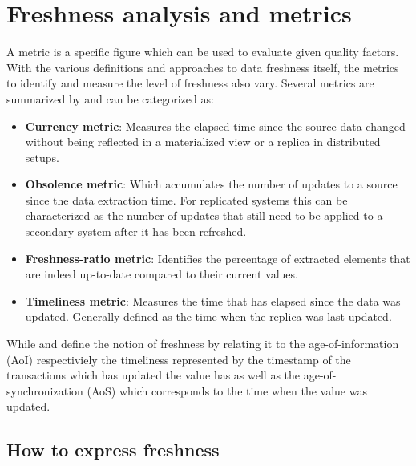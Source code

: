 \section{Freshness analysis and metrics}
\label{r:freshness_metrics}
A metric is a specific figure which can be used to evaluate given quality factors.
With the various definitions and approaches to data freshness itself, the metrics to identify and measure the level of freshness also vary.
Several metrics are summarized by \cite{cho:2000}\cite{pacitti:2000}\cite{peralta:2006} and can be categorized as:
\begin{itemize}
    \item \textbf{Currency metric}: Measures the elapsed time since the source data changed without being reflected in a materialized view or a replica in distributed setups.
    \item \textbf{Obsolence metric}: Which accumulates the number of updates to a source since the data extraction time. For replicated systems this can be characterized as the 
    number of updates that still need to be applied to a secondary system after it has been refreshed.
    \item \textbf{Freshness-ratio metric}: Identifies the percentage of extracted elements that are indeed up-to-date compared to their current values.
    \item \textbf{Timeliness metric}: Measures the time that has elapsed since the data was updated. Generally defined as the time when the replica was last updated.
\end{itemize}



While \cite{bedewy:2016} and \cite{zhong:2018} define the notion of freshness by relating it to the age-of-information (AoI) respectiviely the timeliness represented by 
the timestamp of the transactions which has updated the value has as well as the age-of-synchronization (AoS) which corresponds to the time when the value was updated.



\subsection{How to express freshness}
\label{r:express_freshness}

